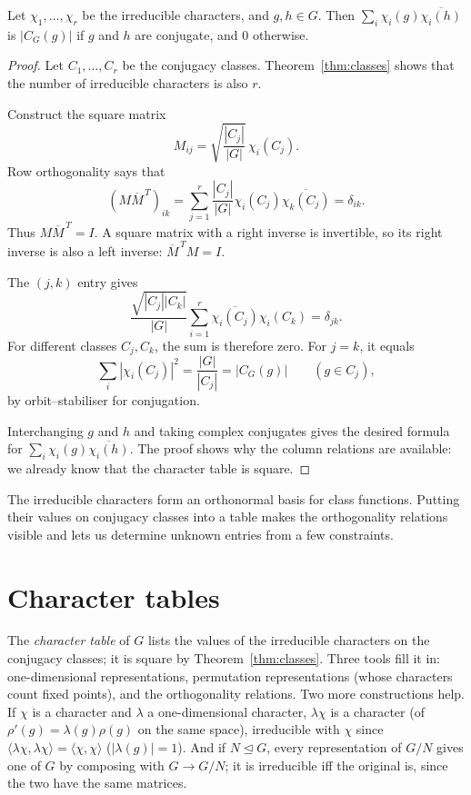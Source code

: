 \begin{corollary}\label{cor:columns}
Let $\chi_1,\dots,\chi_r$ be the irreducible characters, and $g,h\in G$. Then $\sum_i\chi_i(g)\overline{\chi_i(h)}$ is $|C_G(g)|$ if $g$ and $h$ are conjugate, and $0$ otherwise.
\end{corollary}
\begin{proof}
Let $C_1,\ldots,C_r$ be the conjugacy
classes. Theorem~\ref{thm:classes}
shows that the number of irreducible
characters is also $r$.

Construct the square matrix
\[
M_{ij}=\sqrt{\frac{|C_j|}{|G|}}\,
\chi_i(C_j).
\]
Row orthogonality says that
\[
(M\overline M^{\,T})_{ik}
=\sum_{j=1}^r\frac{|C_j|}{|G|}
\chi_i(C_j)\overline{\chi_k(C_j)}
=\delta_{ik}.
\]
Thus $M\overline M^{\,T}=I$.
A square matrix with a right inverse
is invertible, so its right inverse
is also a left inverse:
$\overline M^{\,T}M=I$.

The $(j,k)$ entry gives
\[
\frac{\sqrt{|C_j||C_k|}}{|G|}
\sum_{i=1}^r
\overline{\chi_i(C_j)}\chi_i(C_k)
=\delta_{jk}.
\]
For different classes $C_j,C_k$,
the sum is therefore zero.
For $j=k$, it equals
\[
\sum_i|\chi_i(C_j)|^2
=\frac{|G|}{|C_j|}
=|C_G(g)|\qquad(g\in C_j),
\]
by orbit--stabiliser for conjugation.

Interchanging $g$ and $h$
and taking complex conjugates
gives the desired formula for
$\sum_i\chi_i(g)\overline{\chi_i(h)}$.
The proof shows why the
column relations are available:
we already know that the
character table is square.
\end{proof}

The irreducible characters form an orthonormal basis for class functions. Putting their values on conjugacy classes into a table makes the orthogonality relations visible and lets us determine unknown entries from a few constraints.

\section{Character tables}

The \emph{character table} of $G$ lists the values of the irreducible characters on the conjugacy classes; it is square by Theorem~\ref{thm:classes}. Three tools fill it in: one-dimensional representations, permutation representations (whose characters count fixed points), and the orthogonality relations. Two more constructions help. If $\chi$ is a character and $\lambda$ a one-dimensional character, $\lambda\chi$ is a character (of $\rho'(g)=\lambda(g)\rho(g)$ on the same space), irreducible with $\chi$ since $\langle\lambda\chi,\lambda\chi\rangle=\langle\chi,\chi\rangle$ ($|\lambda(g)|=1$). And if $N\trianglelefteq G$, every representation of $G/N$ gives one of $G$ by composing with $G\to G/N$; it is irreducible iff the original is, since the two have the same matrices.

